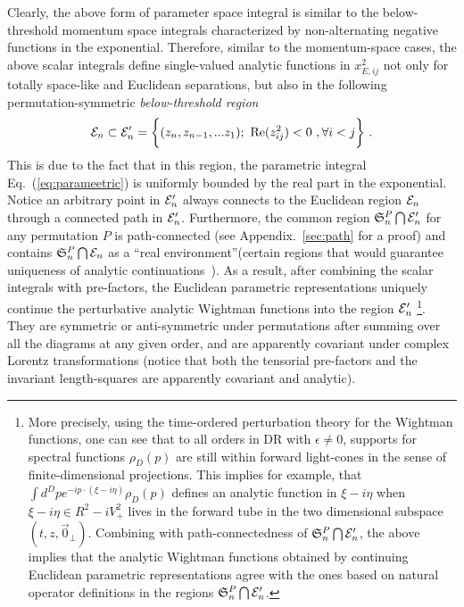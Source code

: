 \documentclass[a4paper,11pt]{article}
\begin{document}
Clearly,  the above form of parameter space integral is similar to the below-threshold momentum space integrals characterized by non-alternating negative functions in the exponential. Therefore, similar to the momentum-space cases, the above scalar integrals define single-valued analytic functions in $x_{E,ij}^2$ not only for totally space-like and Euclidean separations, but also in the following permutation-symmetric {\it below-threshold region}
\begin{align} \label{eq:below-threshold}
{\cal E}_n \subset {\cal E}_n'=\bigg\{(z_n,z_{n-1},...z_1); \  {\rm Re} (z_{ij}^2)<0 \ , \forall i<j \bigg\}\ .
\end{align}
This is due to the fact that in this region, the parametric integral Eq.~(\ref{eq:parameetric}) is uniformly bounded by the real part in the exponential. Notice an arbitrary point in ${\cal E}_n'$ always connects to the Euclidean region ${\cal E}_n$ through a connected path in ${\cal E}_n'$. Furthermore, the common region $\mathfrak{S}_n^P \bigcap {\cal E}_n'$ for any permutation $P$ is path-connected (see Appendix.~\ref{sec:path} for a proof) and contains $\mathfrak{S}_n^P \bigcap {\cal E}_n$ as a ``real environment''(certain regions that would guarantee uniqueness of analytic continuations~\cite{Streater:1989vi}). As a result, after combining the scalar integrals with pre-factors, the Euclidean parametric representations uniquely continue the perturbative analytic Wightman functions into the region ${\cal E}_n'$ \footnote{More precisely, using the time-ordered perturbation theory for the Wightman functions, one can see that to all orders in DR with $\epsilon \ne 0$, supports for spectral functions $\rho_D(p)$ are still within forward light-cones in the sense of finite-dimensional projections. This implies for example, that $\int d^Dp e^{-ip\cdot(\xi-i\eta)}\rho_D(p)$ defines an analytic function in $\xi-i\eta$ when $\xi-i\eta \in R^2-iV_+^2$ lives in the forward tube in the two dimensional subspace $(t,z,\vec{0}_\perp)$. Combining with path-connectedness of $\mathfrak{S}_n^P \bigcap {\cal E}_n'$, the above implies that the analytic Wightman functions obtained by continuing Euclidean parametric representations agree with the ones based on natural operator definitions in the regions $\mathfrak{S}_n^P \bigcap {\cal E}_n'$. }. They are symmetric or anti-symmetric under permutations after summing over all the diagrams at any given order, and are apparently covariant under complex Lorentz transformations (notice that both the tensorial pre-factors and the invariant length-squares are apparently covariant and analytic). 
\end{document}
